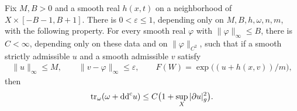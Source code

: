\begin{proposition}\label{hessian:prescribed-potential-trace}
Fix $M,B>0$ and a smooth real $h(x,t)$ on a neighborhood of
$X\times[-B-1,B+1]$. There is $0<\varepsilon\leq1$, depending only on
$M,B,h,\omega,n,m$, with the following property. For every smooth real
$\varphi$ with $\|\varphi\|_\infty\leq B$, there is $C<\infty$, depending
only on these data and on $\|\varphi\|_{C^2}$, such that if a smooth
strictly admissible $u$ and a smooth admissible $v$ satisfy
\begin{gather*}
 \|u\|_\infty\leq M,\qquad\|v-\varphi\|_\infty\leq\varepsilon,\qquad
 F(W)=\exp\bigl((u+h(x,v))/m\bigr),
\end{gather*}
then
\[
 \operatorname{tr}_\omega(\omega+\mathrm{dd}^{\mathrm{c}} u)
                  \leq C\bigl(1+\sup_X|\partial u|_g^2\bigr).
\]
\end{proposition}
